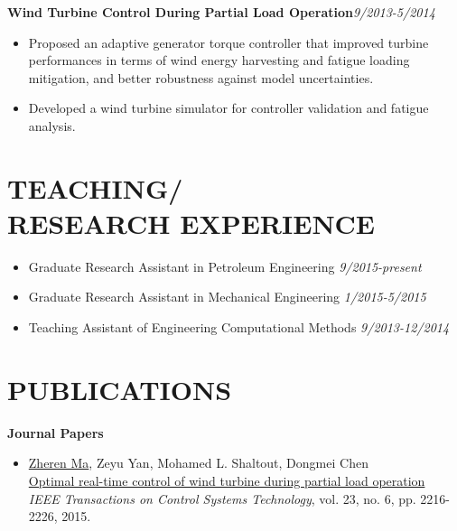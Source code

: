 \documentclass[margin, 9pt]{res} %
\begin{document}
\begin{resume}
\medskip
{\textbf{Wind Turbine Control During Partial Load Operation}}\hfill\textit{9/2013-5/2014}\\
\vspace*{-10pt}
\begin{itemize}[leftmargin=*] \itemsep -3pt
\vspace*{-5pt}
	\item Proposed an adaptive generator torque controller that  improved turbine performances in terms of wind energy harvesting and fatigue loading mitigation, and better robustness against model uncertainties.
    \item Developed a wind turbine simulator for controller validation and fatigue analysis.
\end{itemize}


\section{TEACHING/\\RESEARCH EXPERIENCE}
\begin{itemize}[leftmargin=*] \itemsep -2pt
\vspace*{-2pt}
	\item Graduate Research Assistant in Petroleum Engineering \hfill\textit{9/2015-present}
	\item Graduate Research Assistant in Mechanical Engineering \hfill\textit{1/2015-5/2015}
	\item Teaching Assistant of Engineering Computational Methods \hfill\textit{9/2013-12/2014}
\end{itemize}


\section{PUBLICATIONS}

{\large\textbf{Journal Papers}}
\begin{itemize}[leftmargin=*] \itemsep 0pt
	\item \underline{Zheren Ma}, Zeyu Yan, Mohamed L. Shaltout, Dongmei Chen\\
          \href{http://ieeexplore.ieee.org/xpl/login.jsp?tp=&arnumber=7065260&url=http\%3A\%2F\%2Fieeexplore.ieee.org\%2Fxpls\%2Fabs_all.jsp\%3Farnumber\%3D7065260}
          {Optimal real-time control of wind turbine during partial load operation}\\
          \textit{IEEE Transactions on Control Systems Technology}, vol. 23, no. 6, pp. 2216-2226, 2015.


\end{itemize}
\end{resume}
\end{document}
